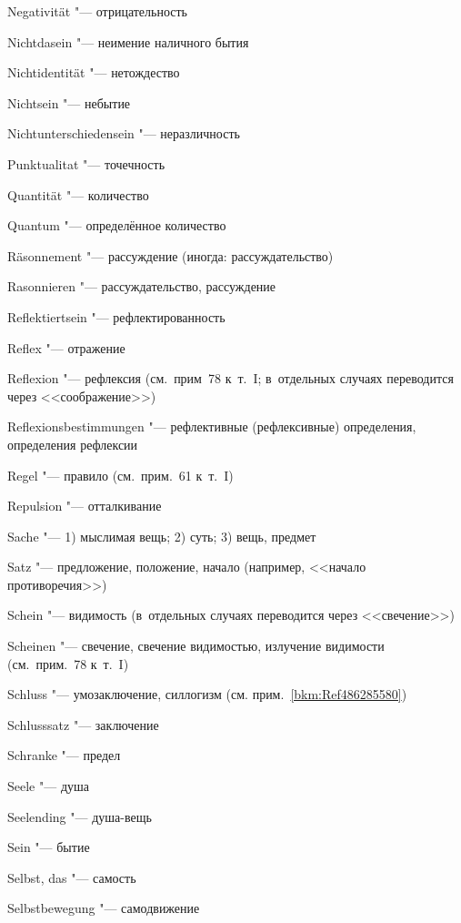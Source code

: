 \begin{multicols}{2}
Nega\-tivi\-tät "--- отрицательность

Nicht\-da\-sein "--- неимение наличного бытия

Nicht\-iden\-tität "--- нетождество

Nicht\-sein "--- небытие

Nicht\-unter\-schieden\-sein "--- неразличность

\bigskip

Punktu\-ali\-tat "--- точечность

\bigskip

Quantität "--- количество

Quantum "--- определённое количество

\bigskip

Räson\-nement "--- рассуждение (иногда: рассуждательство)

Rason\-nieren "--- рассуждательство, рассуждение

Reflek\-tiertsein "--- рефлектированность

Reflex "--- отражение

Reflexion "--- рефлексия (см.~прим~78 к~т.~I; в~отдельных случаях
переводится через <<соображение>>)

Re\-flexions\-bestim\-mungen "--- рефлективные (рефлексивные)
определения, определения рефлексии

Regel "--- правило (см.~прим.~61 к~т.~I)

Repul\-sion "--- отталкивание

\bigskip

Sache "--- 1) мыслимая вещь; 2) суть; 3) вещь, предмет

Satz "--- предложение, положение, начало (например, <<начало противоречия>>)

Schein "--- видимость (в~отдельных случаях переводится через <<свечение>>)

Scheinen "--- свечение, свечение видимостью, излучение видимости
(см.~прим.~78 к~т.~I)

Schluss "--- умозаключение, силлогизм (см. прим.~\ref{bkm:Ref486285580})

Schluss\-satz "--- заключение

Schranke "--- предел

Seele "--- душа

Seelending "--- душа-вещь

Sein "--- бытие

Selbst, das "--- самость

Selbst\-bewegung "--- самодвижение


\end{multicols}
